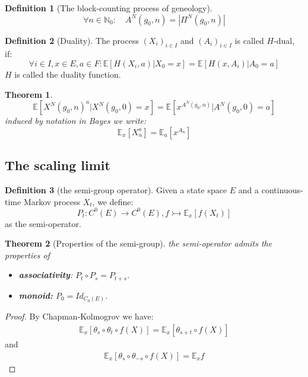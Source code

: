 \documentclass[a4paper,11pt]{book}
\newtheorem{theorem}{Theorem}[section]
\theoremstyle{definition}
\newtheorem{definition}{Definition}[section]
\theoremstyle{remark}
\begin{document}
\begin{definition}[The block-counting process of geneology]
\begin{equation*}
	\forall n \in \mathbb{N}_0: \quad A^N(g_0, n) = |\Pi^N(g_0, n)|
\end{equation*}
\end{definition}

\begin{definition}[Duality]
	The process $(X_i)_{i \in I}$ and $(A_i)_{i \in I}$ is called $H$-dual, if:
	\begin{equation*}
		\forall i \in I, x \in E, a \in F: 
		\mathbb{E}[H(X_i, a) |X_0 = x] = \mathbb{E}[H(x, A_i) | A_0 = a]
	\end{equation*}
	$H$ is called the duality function.
\end{definition}

\begin{theorem}
	\begin{equation*}
		\mathbb{E}[X^N(g_0, n)^a|X^N(g_0, 0) = x] = \mathbb{E}[x^{A^N(g_0, n)}  |A^N(g_0, 0) = a]
	\end{equation*}
	induced by notation in Bayes we write:
	\begin{equation*}
		\mathbb{E}_x[X_n^a] = \mathbb{E}_a[x^{A_n}]
	\end{equation*}
\end{theorem}


\subsection{The scaling limit}
\begin{definition}[the semi-group operator]
Given a state space $E$ and a continuous-time Markov process $X_t$, we define:
\begin{equation*}
	P_t: C^0(E) \rightarrow C^0(E), f \rightarrowtail \mathbb{E}_x[f(X_t)] 
\end{equation*}
as the semi-operator.
\end{definition}

\begin{theorem}[Properties of the semi-group]
	the semi-operator admits the properties of
\begin{itemize}
	\item \textbf{associativity}: $P_t \circ P_s = P_{t + s}$.
	\item \textbf{monoid:} $P_0 = Id_{C_0(E)}$.
\end{itemize}
\end{theorem}
\begin{proof}
	By Chapman-Kolmogrov we have:
	\begin{align*}
		\mathbb{E}_x [\theta_s \circ \theta_t \circ f(X)] 
	   =\mathbb{E}_x[\theta_{s + t} \circ f(X) ]
	\end{align*}
	and 
	\begin{align*}
		\mathbb{E}_x[\theta_s \circ \theta_{-s} \circ f(X)] = \mathbb{E}_x f
	\end{align*}
\end{proof}
\end{document}
